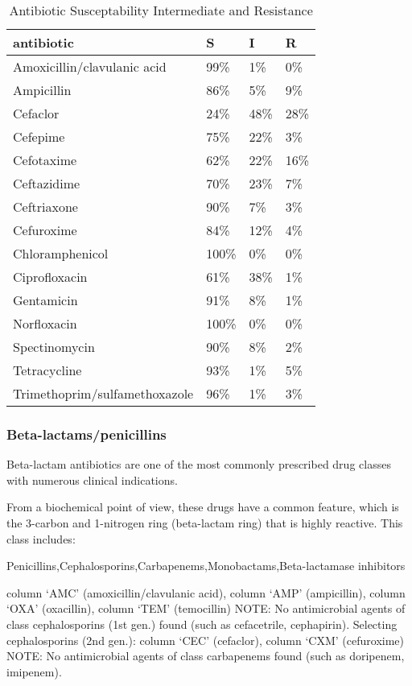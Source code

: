 \documentclass[
]{article}
\begin{document}
\begin{table}

\caption{\label{tab:unnamed-chunk-7}Antibiotic Susceptability Intermediate and Resistance}
\centering
\begin{tabular}[t]{l|l|l|l}
\hline
antibiotic & S & I & R\\
\hline
Amoxicillin/clavulanic acid & 99\% & 1\% & 0\%\\
\hline
Ampicillin & 86\% & 5\% & 9\%\\
\hline
Cefaclor & 24\% & 48\% & 28\%\\
\hline
Cefepime & 75\% & 22\% & 3\%\\
\hline
Cefotaxime & 62\% & 22\% & 16\%\\
\hline
Ceftazidime & 70\% & 23\% & 7\%\\
\hline
Ceftriaxone & 90\% & 7\% & 3\%\\
\hline
Cefuroxime & 84\% & 12\% & 4\%\\
\hline
Chloramphenicol & 100\% & 0\% & 0\%\\
\hline
Ciprofloxacin & 61\% & 38\% & 1\%\\
\hline
Gentamicin & 91\% & 8\% & 1\%\\
\hline
Norfloxacin & 100\% & 0\% & 0\%\\
\hline
Spectinomycin & 90\% & 8\% & 2\%\\
\hline
Tetracycline & 93\% & 1\% & 5\%\\
\hline
Trimethoprim/sulfamethoxazole & 96\% & 1\% & 3\%\\
\hline
\end{tabular}
\end{table}

\hypertarget{beta-lactamspenicillins}{%
\subsubsection{Beta-lactams/penicillins}\label{beta-lactamspenicillins}}

Beta-lactam antibiotics are one of the most commonly prescribed drug
classes with numerous clinical indications.

From a biochemical point of view, these drugs have a common feature,
which is the 3-carbon and 1-nitrogen ring (beta-lactam ring) that is
highly reactive. This class includes:

Penicillins,Cephalosporins,Carbapenems,Monobactams,Beta-lactamase
inhibitors

column `AMC' (amoxicillin/clavulanic acid), column `AMP' (ampicillin),
column `OXA' (oxacillin), column `TEM' (temocillin) NOTE: No
antimicrobial agents of class cephalosporins (1st gen.) found (such as
cefacetrile, cephapirin). Selecting cephalosporins (2nd gen.): column
`CEC' (cefaclor), column `CXM' (cefuroxime) NOTE: No antimicrobial
agents of class carbapenems found (such as doripenem, imipenem).
\end{document}
